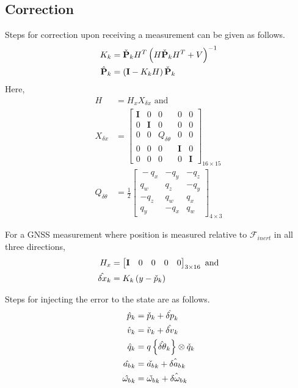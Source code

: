 \documentclass{article}
\begin{document}
\subsection{Correction}
Steps for correction upon receiving a measurement can be given as follows.
\begin{align}
    K_k &= \Check{\textbf{P}}_kH^T\left(H\Check{\textbf{P}}_kH^T+V\right)^{-1} \\
    \hat{\textbf{P}}_k &= \left(\textbf{I}-K_kH\right)\Check{\textbf{P}}_k
\end{align}{}
Here,
\begin{align}
    H &= H_xX_{\delta x} \text{ and} \\
    X_{\delta x} &= \left[\begin{matrix}{}\textbf{I}&0&0&0&0\\0&\textbf{I}&0&0&0\\0&0&Q_{\delta \theta}&0&0\\0&0&0&\textbf{I}&0\\0&0&0&0&\textbf{I}\end{matrix}\right]_{16\times15} \\
    Q_{\delta\theta} &=\frac{1}{2} \left[\begin{matrix}{}-q_x&-q_y&-q_z\\q_w&q_z&-q_y\\-q_z&q_w&q_x\\q_y&-q_x&q_w\end{matrix}\right]_{4\times3}
\end{align}{}

For a GNSS measurement where position is measured relative to $\mathcal{F}_{inert}$ in all three directions,
\begin{align}
    H_x &= \left[\begin{matrix}{}\textbf{I}&0&0&0&0\end{matrix}\right]_{3\times16} \text{ and} \\
    \Hat{\delta x}_k &= K_k\left(y-\Check{p}_k\right)
\end{align}{}

Steps for injecting the error to the state are as follows.
\begin{align}
    \hat{p}_k &= \Check{p}_k + \hat{\delta p}_k \\
    \hat{v}_k &= \Check{v}_k + \hat{\delta v}_k \\
    \hat{q}_k &= q\left\{\hat{\delta\theta}_k\right\}\otimes\Check{q}_k \\
    \hat{a_b}_k &= \Check{a_b}_k + \hat{\delta a_b}_k \\
    \hat{\omega_b}_k &= \Check{\omega_b}_k + \hat{\delta \omega_b}_k \\
\end{align}{}
\end{document}
